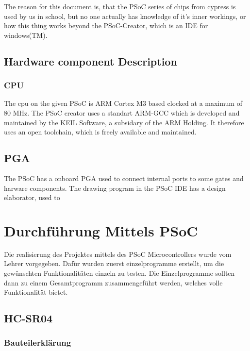 \documentclass[12pt,a4paper]{article}
\begin{document}
The reason for this document is, that the PSoC series of chips from cypress is
used by us in school, but no one actually has knowledge of it's inner workings,
or how this thing works beyond the PSoC-Creator, which is an IDE for 
windows(TM).

\subsection{Hardware component Description}

\subsubsection{CPU}

The cpu on the given PSoC is ARM Cortex M3 based clocked at a maximum of 80 MHz.
The PSoC creator uses a standart ARM-GCC which is developed and maintained by
the KEIL Software, a subsidary of the ARM Holding. It therefore uses an open
toolchain, which is freely available and maintained.

\subsection{PGA}

The PSoC has a onboard PGA used to connect internal ports to some gates and
harware components. The drawing program in the PSoC IDE has a design elaborator,
used to 


\fi

\section{Durchführung Mittels PSoC}

	Die realisierung des Projektes mittels des PSoC Microcontrollers wurde
	vom Lehrer vorgegeben. Dafür wurden zuerst einzelprogramme erstellt,
	um die gewünschten Funktionalitäten einzeln zu testen. Die
	Einzelprogramme sollten dann zu einem Gesamtprogramm zusammengeführt
	werden, welches volle Funktionalität bietet.

\subsection{HC-SR04}

\subsubsection{Bauteilerklärung}
	
\end{document}
